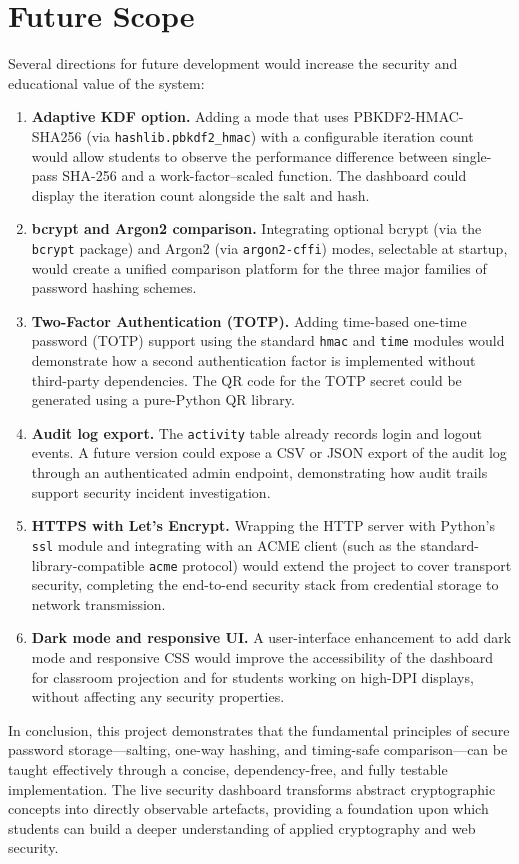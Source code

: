 \section{Future Scope}
\label{sec:conclusion_future}

Several directions for future development would increase the security and educational value of the system:

\begin{enumerate}
  \item \textbf{Adaptive KDF option.} Adding a mode that uses PBKDF2-HMAC-SHA256 (via \texttt{hashlib.pbkdf2\_hmac}) with a configurable iteration count would allow students to observe the performance difference between single-pass SHA-256 and a work-factor--scaled function. The dashboard could display the iteration count alongside the salt and hash.

  \item \textbf{bcrypt and Argon2 comparison.} Integrating optional bcrypt (via the \texttt{bcrypt} package) and Argon2 (via \texttt{argon2-cffi}) modes, selectable at startup, would create a unified comparison platform for the three major families of password hashing schemes.

  \item \textbf{Two-Factor Authentication (TOTP).} Adding time-based one-time password (TOTP) support using the standard \texttt{hmac} and \texttt{time} modules would demonstrate how a second authentication factor is implemented without third-party dependencies. The QR code for the TOTP secret could be generated using a pure-Python QR library.

  \item \textbf{Audit log export.} The \texttt{activity} table already records login and logout events. A future version could expose a CSV or JSON export of the audit log through an authenticated admin endpoint, demonstrating how audit trails support security incident investigation.

  \item \textbf{HTTPS with Let's Encrypt.} Wrapping the HTTP server with Python's \texttt{ssl} module and integrating with an ACME client (such as the standard-library-compatible \texttt{acme} protocol) would extend the project to cover transport security, completing the end-to-end security stack from credential storage to network transmission.

  \item \textbf{Dark mode and responsive UI.} A user-interface enhancement to add dark mode and responsive CSS would improve the accessibility of the dashboard for classroom projection and for students working on high-DPI displays, without affecting any security properties.
\end{enumerate}

In conclusion, this project demonstrates that the fundamental principles of secure password storage---salting, one-way hashing, and timing-safe comparison---can be taught effectively through a concise, dependency-free, and fully testable implementation. The live security dashboard transforms abstract cryptographic concepts into directly observable artefacts, providing a foundation upon which students can build a deeper understanding of applied cryptography and web security.
